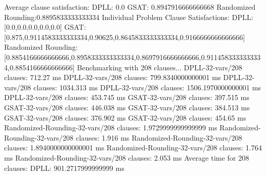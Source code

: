 \documentclass{article}
\begin{document}
Average clause satisfaction:\newline
  DPLL:               0.0\newline
  GSAT:               0.8947916666666668\newline
  Randomized Rounding:0.8895833333333334\newline
\newline
Individual Problem Clause Satisfactions:\newline
  DPLL:               [0.0,0.0,0.0,0.0,0.0]\newline
  GSAT:               [0.875,0.9114583333333334,0.90625,0.8645833333333334,0.9166666666666666]\newline
  Randomized Rounding:[0.8854166666666666,0.8958333333333334,0.8697916666666666,0.9114583333333334,0.8854166666666666]\newline
\newline
\newline
Benchmarking with 208 clauses...\newline
DPLL-32-vars/208 clauses: 712.27 ms\newline
DPLL-32-vars/208 clauses: 799.8340000000001 ms\newline
DPLL-32-vars/208 clauses: 1034.313 ms\newline
DPLL-32-vars/208 clauses: 1506.1970000000001 ms\newline
DPLL-32-vars/208 clauses: 453.745 ms\newline
GSAT-32-vars/208 clauses: 397.515 ms\newline
GSAT-32-vars/208 clauses: 446.038 ms\newline
GSAT-32-vars/208 clauses: 384.513 ms\newline
GSAT-32-vars/208 clauses: 376.902 ms\newline
GSAT-32-vars/208 clauses: 454.65 ms\newline
Randomized-Rounding-32-vars/208 clauses: 1.9729999999999999 ms\newline
Randomized-Rounding-32-vars/208 clauses: 1.916 ms\newline
Randomized-Rounding-32-vars/208 clauses: 1.8940000000000001 ms\newline
Randomized-Rounding-32-vars/208 clauses: 1.764 ms\newline
Randomized-Rounding-32-vars/208 clauses: 2.053 ms\newline
Average time for 208 clauses:\newline
  DPLL:               901.2717999999999 ms\newline
\end{document}
